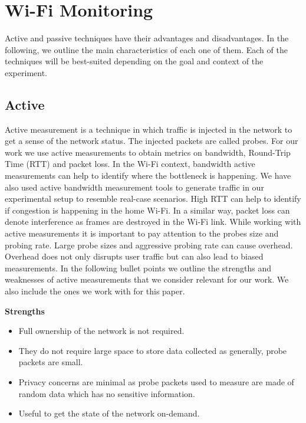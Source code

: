 \section{Wi-Fi Monitoring}\label{Wireless Monitoring Metrics}

 Active and passive techniques have their advantages and disadvantages. In the following, we outline the main characteristics of each one of them. Each of the techniques will be best-suited depending on the  goal and context of the experiment.

\subsection{Active}

Active measurement is a technique in which traffic is injected in the network to get a sense of the network status. The injected packets are called probes. For our work we use active measurements to obtain metrics on bandwidth, Round-Trip Time (RTT) and packet loss. In the Wi-Fi context, bandwidth active measurements can help to identify where the bottleneck is happening. We have also used active bandwidth measurement tools to generate traffic in our experimental setup to resemble real-case scenarios. High RTT can help to identify if congestion is happening in the home Wi-Fi. In a similar way, packet loss can denote interference as frames are destroyed in the Wi-Fi link. While working with active measurements it is  important to pay attention to the probes size and probing rate. Large probe sizes and aggressive probing rate can cause overhead. Overhead does not only disrupts user traffic but can also lead to biased measurements. In the following bullet points we outline the strengths and weaknesses of active measurements that we consider relevant for our work. We also include the ones we work with for this paper.


\textbf{Strengths}
\begin{itemize}
	\item Full ownership of the network is not required.
	\item They do not require large space to store data collected as generally, probe packets are small.
	\item Privacy concerns are minimal as probe packets used to measure are made of random data which has no sensitive information.
	\item Useful to get the state of the network on-demand.
\end{itemize}
	

